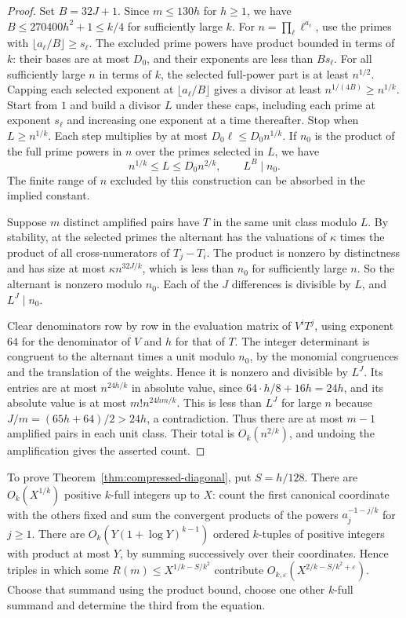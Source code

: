 \documentclass[11pt,reqno]{amsart}
\newcommand{\eps}{\varepsilon}
\begin{document}
\begin{proof}
Set \(B=32J+1\). Since \(m\le130h\) for \(h\ge1\), we
have \(B\le270400h^2+1\le k/4\) for sufficiently large \(k\).
For \(n=\prod_\ell\ell^{a_\ell}\), use the primes with
\(\lfloor a_\ell/B\rfloor\ge s_\ell\).
The excluded prime powers have product bounded in terms
of \(k\): their bases are at most \(D_0\), and
their exponents are less than \(Bs_\ell\).
For all sufficiently large \(n\) in terms of \(k\), the selected
full-power part is at least \(n^{1/2}\). Capping each selected
exponent at \(\lfloor a_\ell/B\rfloor\) gives a divisor at least
\(n^{1/(4B)}\ge n^{1/k}\).
Start from \(1\) and build a divisor \(L\) under these caps,
including each prime at exponent \(s_\ell\) and increasing
one exponent at a time thereafter. Stop when \(L\ge n^{1/k}\).
Each step multiplies by at most \(D_0\ell\le D_0n^{1/k}\).
If \(n_0\) is the product of the full prime powers in \(n\)
over the primes selected in \(L\), we have
\[
 n^{1/k}\le L\le D_0n^{2/k},\qquad L^B\mid n_0 .
\]
The finite range of \(n\) excluded by this construction can
be absorbed in the implied constant.

Suppose \(m\) distinct amplified pairs have \(T\) in the same
unit class modulo \(L\). By stability, at the selected primes
the alternant has the valuations of \(\kappa\) times the product
of all cross-numerators of \(T_j-T_i\).
The product is nonzero by distinctness and has size at most
\(\kappa n^{32J/k}\), which is less than \(n_0\) for sufficiently
large \(n\). So the alternant is nonzero modulo \(n_0\).
Each of the \(J\) differences is divisible by \(L\), and
\(L^J\mid n_0\).

Clear denominators row by row in the evaluation matrix of
\(V^i T^j\), using exponent \(64\) for the denominator of \(V\)
and \(h\) for that of \(T\).
The integer determinant is congruent to the alternant times
a unit modulo \(n_0\), by the monomial congruences and the
translation of the weights. Hence it is nonzero and
divisible by \(L^J\).
Its entries are at most \(n^{24h/k}\) in absolute value,
since \(64\cdot h/8+16h=24h\), and its absolute value is at most
\(m!n^{24hm/k}\). This is less than \(L^J\) for large \(n\)
because \(J/m=(65h+64)/2>24h\), a contradiction.
Thus there are at most \(m-1\) amplified pairs in each unit class.
Their total is \(O_k(n^{2/k})\), and undoing the amplification gives
the asserted count.
\end{proof}

To prove Theorem~\ref{thm:compressed-diagonal}, put \(S=h/128\).
There are \(O_k(X^{1/k})\) positive \(k\)-full integers up to \(X\):
count the first canonical coordinate with the others fixed and
sum the convergent products of the powers \(a_j^{-1-j/k}\) for \(j\ge1\).
There are \(O_k(Y(1+\log Y)^{k-1})\) ordered \(k\)-tuples of
positive integers with product at most \(Y\), by summing
successively over their coordinates. Hence triples in which some
\(R(m)\le X^{1/k-S/k^2}\) contribute
\(O_{k,\eps}(X^{2/k-S/k^2+\eps})\). Choose that summand using
the product bound, choose one other \(k\)-full summand and
determine the third from the equation.
\end{document}
